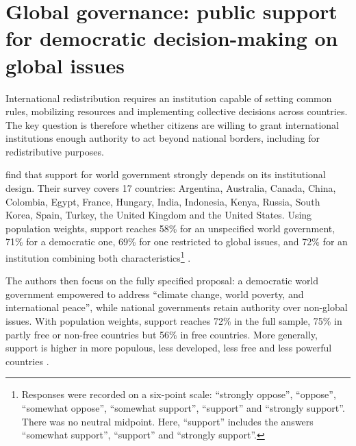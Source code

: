 \documentclass[11pt,a4paper]{article}
\begin{document}
\section{Global governance: public support for democratic decision-making on global issues}


International redistribution requires an institution capable of setting common rules, mobilizing resources and implementing collective decisions across countries. The key question is therefore whether citizens are willing to grant international institutions enough authority to act beyond national borders, including for redistributive purposes. 

\citet{ghassim_who_2024} find that support for world government strongly depends on its institutional design. Their survey covers 17 countries: Argentina, Australia, Canada, China, Colombia, Egypt, France, Hungary, India, Indonesia, Kenya, Russia, South Korea, Spain, Turkey, the United Kingdom and the United States. Using population weights, support reaches 58\% for an unspecified world government, 71\% for a democratic one, 69\% for one restricted to global issues, and 72\% for an institution combining both characteristics\footnote{Responses were recorded on a six-point scale: ``strongly oppose'', ``oppose'', ``somewhat oppose'', ``somewhat support'', ``support'' and ``strongly support''. There was no neutral midpoint. Here, ``support'' includes the answers ``somewhat support'', ``support'' and ``strongly support''.} \citep[Figure 2]{ghassim_who_2024}.

The authors then focus on the fully specified proposal: a democratic world government empowered to address ``climate change, world poverty, and international peace'', while national governments retain authority over non-global issues. With population weights, support reaches 72\% in the full sample, 75\% in partly free or non-free countries but 56\% in free countries. More generally, support is higher in more populous, less developed, less free and less powerful countries \citep[Figures 2 \& 5]{ghassim_who_2024}.
\end{document}
